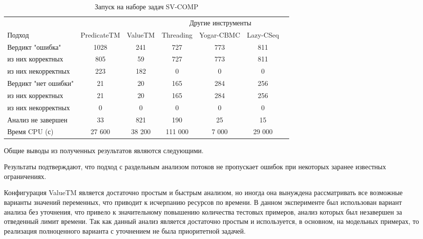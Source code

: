 \begin{center}
  \begin{table}[h]\footnotesize \centering
  	\label{table-sv-comp-tools}
    \caption{Запуск на наборе задач SV-COMP}
    \begin{tabular}{ | l | c | c | c | c | c | c |}
      \hline
      		& 		\multicolumn{2}{c|}{\theory} & \multicolumn{3}{c|}{Другие инструменты}  \\
      Подход         				& PredicateTM   & ValueTM 	& Threading & Yogar-CBMC 	& Lazy-CSeq  \\ \hline
      Вердикт "ошибка" 				& 1028    		& 241       & 727      	& 773       	& 811       \\ 
  \hspace{0.5cm} из них корректных 	& 805 			& 59 		& 727      	& 773       	& 811       \\ 
  \hspace{0.5cm} из них некорректных & 223 			& 182 		& 0    		& 0       		& 0          \\ \hline
      Вердикт "нет ошибки"  		& 21      		& 20        & 165       & 284        	& 256     \\ 
  \hspace{0.5cm} из них корректных 	& 21 			& 20    	& 165       & 284        	& 256       \\
  \hspace{0.5cm} из них некорректных & 0 			& 0    		& 0       	& 0         	& 0        \\ \hline
      Анализ не завершен       		& 33     		& 821       & 190      	& 25        	& 15      \\ \hline
      Время CPU (с)   				& 27 600 		& 38 200    & 111 000  	& 7 000    		& 29 000    \\ 
      \hline
    \end{tabular}
  \end{table}
\end{center}

Общие выводы из полученных результатов являются следующими.

Результаты подтверждают, что подход с раздельным анализом потоков не пропускает ошибок при некоторых заранее известных ограничениях.

Конфигурация ValueTM является достаточно простым и быстрым анализом, но иногда она вынуждена рассматривать все возможные варианты значений переменных, что приводит к исчерпанию ресурсов по времени.
В данном эксперименте был использован вариант анализа без уточнения, что привело к значительному повышению количества тестовых примеров, анализ которых был незавершен за отведенный лимит времени. 
Так как данный анализ является достаточно простым и используется, в основном, на модельных примерах, то реализация полноценного варианта с уточнением не была приоритетной задачей.

